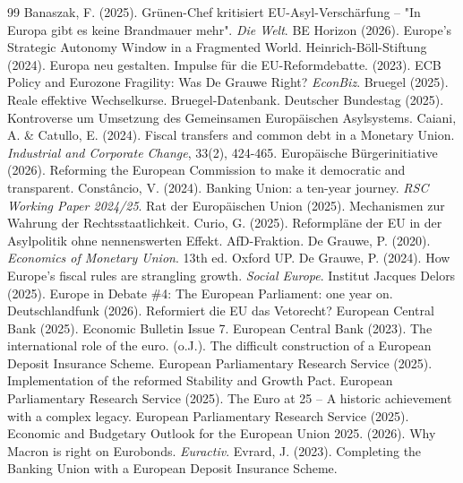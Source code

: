 \documentclass[12pt,a4paper]{article}
\begin{document}
	\begin{thebibliography}{99}
		 Banaszak, F. (2025). Grünen-Chef kritisiert EU-Asyl-Verschärfung – "In Europa gibt es keine Brandmauer mehr". \textit{Die Welt}.
		 BE Horizon (2026). Europe's Strategic Autonomy Window in a Fragmented World.
		 Heinrich-Böll-Stiftung (2024). Europa neu gestalten. Impulse für die EU-Reformdebatte.
		 (2023). ECB Policy and Eurozone Fragility: Was De Grauwe Right? \textit{EconBiz}.
		 Bruegel (2025). Reale effektive Wechselkurse. Bruegel-Datenbank.
		 Deutscher Bundestag (2025). Kontroverse um Umsetzung des Gemeinsamen Europäischen Asylsystems.
		 Caiani, A. \& Catullo, E. (2024). Fiscal transfers and common debt in a Monetary Union. \textit{Industrial and Corporate Change}, 33(2), 424-465.
		 Europäische Bürgerinitiative (2026). Reforming the European Commission to make it democratic and transparent.
		 Constâncio, V. (2024). Banking Union: a ten-year journey. \textit{RSC Working Paper 2024/25}.
		 Rat der Europäischen Union (2025). Mechanismen zur Wahrung der Rechtsstaatlichkeit.
		 Curio, G. (2025). Reformpläne der EU in der Asylpolitik ohne nennenswerten Effekt. AfD-Fraktion.
		 De Grauwe, P. (2020). \textit{Economics of Monetary Union}. 13th ed. Oxford UP.
		 De Grauwe, P. (2024). How Europe’s fiscal rules are strangling growth. \textit{Social Europe}.
		 Institut Jacques Delors (2025). Europe in Debate \#4: The European Parliament: one year on.
		 Deutschlandfunk (2026). Reformiert die EU das Vetorecht?
		 European Central Bank (2025). Economic Bulletin Issue 7.
		 European Central Bank (2023). The international role of the euro.
		 (o.J.). The difficult construction of a European Deposit Insurance Scheme.
		 European Parliamentary Research Service (2025). Implementation of the reformed Stability and Growth Pact.
		 European Parliamentary Research Service (2025). The Euro at 25 – A historic achievement with a complex legacy.
		 European Parliamentary Research Service (2025). Economic and Budgetary Outlook for the European Union 2025.
		 (2026). Why Macron is right on Eurobonds. \textit{Euractiv}.
		 Evrard, J. (2023). Completing the Banking Union with a European Deposit Insurance Scheme.

\end{thebibliography}
\end{document}
